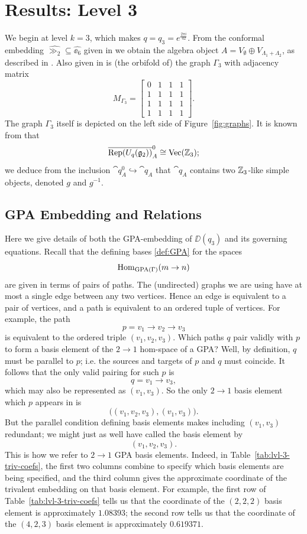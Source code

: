\section{Results: Level 3}

We begin at level $k=3$, which makes $q=q_3=e^{\frac{2\pi i}{42}}$. From the conformal embedding $\hat{\gg_2}\subseteq\hat{\ee_6}$ given in \cite{DMNO} we obtain the algebra object $A=V_{\emptyset} \oplus V_{\Lambda_1+\Lambda_2}$, as described in \cite{g2_graphs}. Also given in \cite{g2_graphs} is (the orbifold of) the graph $\Gamma_3$ with adjacency matrix
\[
    M_{\Gamma_3} = \begin{bmatrix} 0&1&1&1\\ 1&1&1&1\\ 1&1&1&1\\ 1&1&1&1\end{bmatrix}.
\]
The graph $\Gamma_3$ itself is depicted on the left side of Figure~\ref{fig:graphs}.
It is known from \cite{DMNO} that 
\[
    \overline{\operatorname{Rep}(U_{q}(\mathfrak{g}_2))}_A^0\cong \operatorname{Vec}(\mathbb{Z}_3);
\]
we deduce from the inclusion $\cat{q}_A^0 \hookrightarrow \cat{q}_A$ that $\cat{q}_A$ contains two $\mathbb{Z}_3$-like simple objects, denoted $g$ and $g^{-1}$. 



\subsection{GPA Embedding and Relations}
Here we give details of both the GPA-embedding of $\DD(q_3)$ and its governing equations. 
Recall that the defining bases \ref{def:GPA} for the spaces 
\[
    \operatorname{Hom}_{\operatorname{GPA}(\Gamma)}(m\to n)
\]
are given in terms of pairs of paths. The (undirected) graphs we are using have at most a single edge between any two vertices. Hence an edge is equivalent to a pair of vertices, and a path is equivalent to an ordered tuple of vertices. For example, the path
\[
    p = v_1 \longrightarrow v_2 \longrightarrow v_3
\]
is equivalent to the ordered triple $(v_1,v_2,v_3)$. Which paths $q$ pair validly with $p$ to form a basis element of the $2\to 1$ hom-space of a GPA? Well, by definition, $q$ must be parallel to $p$; i.e. the sources and targets of $p$ and $q$ must coincide. It follows that the only valid pairing for such $p$ is
\[
    q = v_1 \longrightarrow v_3,
\]
which may also be represented as $(v_1,v_3)$. So the only $2\to 1$ basis element which $p$ appears in is
\[
    \big( (v_1,v_2,v_3), (v_1,v_3) \big).
\]
But the parallel condition defining basis elements makes including $(v_1,v_3)$ redundant; we might just as well have called the basis element by 
\[
    (v_1,v_2,v_3).
\]
This is how we refer to $2\to 1$ GPA basis elements. Indeed, in Table~\ref{tab:lvl-3-triv-coefs}, the first two columns combine to specify which basis elements are being specified, and the third column gives the approximate coordinate of the trivalent embedding on that basis element. For example, the first row of Table~\ref{tab:lvl-3-triv-coefs} tells us that the coordinate of the $(2,2,2)$ basis element is approximately $1.08393$; the second row tells us that the coordinate of the $(4,2,3)$ basis element is approximately $0.619371$. 


